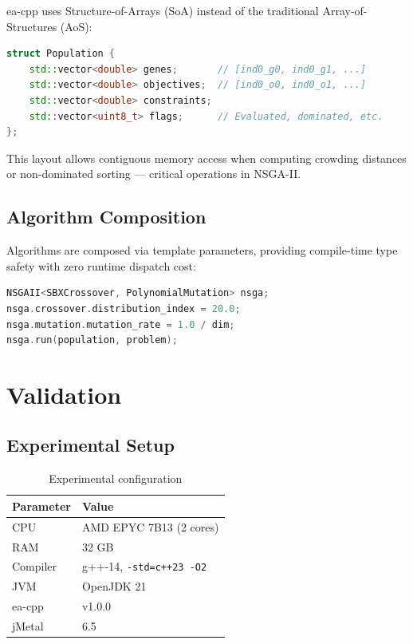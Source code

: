 \documentclass[10pt,a4paper]{article}
\begin{document}
ea-cpp uses Structure-of-Arrays (SoA) instead of the traditional Array-of-Structures (AoS):

\begin{lstlisting}[language=C++,caption={Population SoA representation},label={lst:soa}]
struct Population {
    std::vector<double> genes;       // [ind0_g0, ind0_g1, ...]
    std::vector<double> objectives;  // [ind0_o0, ind0_o1, ...]
    std::vector<double> constraints;
    std::vector<uint8_t> flags;      // Evaluated, dominated, etc.
};
\end{lstlisting}

This layout allows contiguous memory access when computing crowding distances or non-dominated sorting --- critical operations in NSGA-II.

\subsection{Algorithm Composition}

Algorithms are composed via template parameters, providing compile-time type safety with zero runtime dispatch cost:

\begin{lstlisting}[language=C++,caption={Algorithm composition},label={lst:compose}]
NSGAII<SBXCrossover, PolynomialMutation> nsga;
nsga.crossover.distribution_index = 20.0;
nsga.mutation.mutation_rate = 1.0 / dim;
nsga.run(population, problem);
\end{lstlisting}

\section{Validation}

\subsection{Experimental Setup}

\begin{table}[h]
\centering
\caption{Experimental configuration}
\label{tab:setup}
\begin{tabular}{@{}ll@{}}
\toprule
\textbf{Parameter} & \textbf{Value} \\
\midrule
CPU & AMD EPYC 7B13 (2 cores) \\
RAM & 32 GB \\
Compiler & g++-14, \texttt{-std=c++23 -O2} \\
JVM & OpenJDK 21 \\
ea-cpp & v1.0.0 \\
jMetal & 6.5 \\
\bottomrule
\end{tabular}
\end{table}
\end{document}
